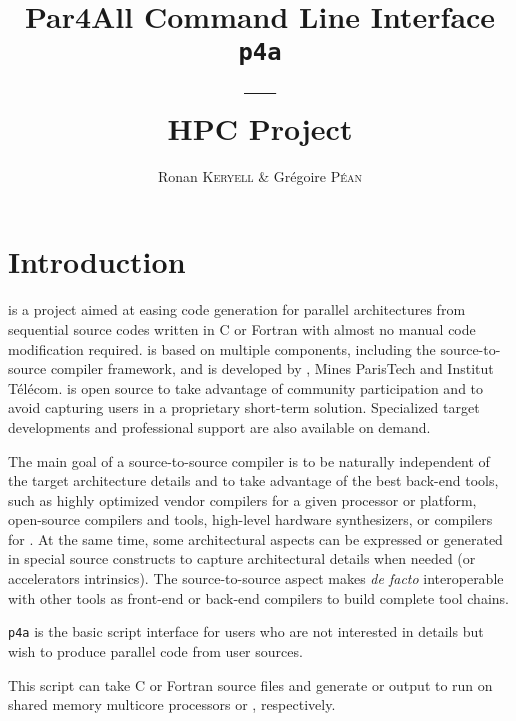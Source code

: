 \documentclass[a4paper]{article}
\begin{document}
\title{Par4All Command Line Interface\\
  \texttt{p4a}\\
  ---\\
  HPC Project}

\author{Ronan \textsc{Keryell} \& Grégoire \textsc{Péan}}

\maketitle

\tableofcontents{}



\section{Introduction}
\label{sec:introduction}

\Apfa is a project aimed at easing code generation for parallel
architectures from sequential source codes written in C or Fortran with
almost no manual code modification required. \Apfa is based on multiple
components, including the \Apips source-to-source compiler framework, and is
developed by \Ahpcp, Mines ParisTech and Institut Télécom. \Apfa is
open source to take advantage of community participation and to avoid
capturing users in a proprietary short-term solution. Specialized target
developments and professional support are also available on demand.

The main goal of a source-to-source compiler is to be naturally
independent of the target architecture details and to take advantage
of the best
back-end tools, such as highly optimized vendor compilers for a given
processor or platform, open-source compilers and tools, high-level
hardware synthesizers, \Acuda or \Aopencl compilers for \Agpu. At the same
time, some architectural aspects can be expressed or generated in
special source constructs to capture architectural details when needed
(\Asimd or accelerators intrinsics). The source-to-source aspect makes
\Apfa \emph{de facto} interoperable with other tools as front-end
or back-end compilers to build complete tool chains.

\texttt{p4a} is the basic script interface for users who are
not interested in \Apips details but wish to produce parallel code from
user sources.

This script can take C or Fortran source files and generate \Aopenmp or
\Acuda output to run on shared memory multicore processors or
\Agpu, respectively.
\end{document}
